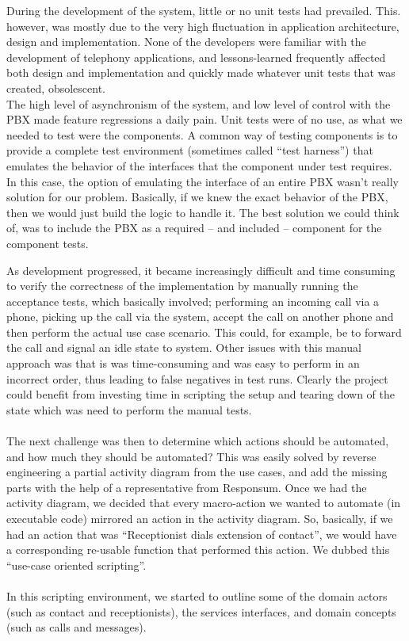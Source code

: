 During the development of the system, little or no unit tests had prevailed. This. however, was mostly due to the very high fluctuation in application architecture, design and implementation. None of the developers were familiar with the development of telephony applications, and lessons-learned frequently affected both design and implementation and quickly made whatever unit tests that was created, obsolescent.\\
The high level of asynchronism of the system, and low level of control with the PBX made feature regressions a daily pain. Unit tests were of no use, as what we needed to test were the components. A common way of testing components is to provide a complete test environment (sometimes called ``test harness'') that emulates the behavior of the interfaces that the component under test requires. In this case, the option of emulating the interface of an entire PBX wasn't really solution for our problem. Basically, if we knew the exact behavior of the PBX, then we would just build the logic to handle it. The best solution we could think of, was to include the PBX as a required -- and included -- component for the component tests.

As development progressed, it became increasingly difficult and time consuming to verify the correctness of the implementation by manually running the acceptance tests, which basically involved; performing an incoming call via a phone, picking up the call via the system, accept the call on another phone and then perform the actual use case scenario. This could, for example, be to forward the call and signal an idle state to system. Other issues with this manual approach was that is was time-consuming and was easy to perform in an incorrect order, thus leading to false negatives in test runs. Clearly the project could benefit from investing time in scripting the setup and tearing down of the state which was need to perform the manual tests.\\\\
The next challenge was then to determine which actions should be automated, and how much they should be automated? This was easily solved by reverse engineering a partial activity diagram from the use cases, and add the missing parts with the help of a representative from Responsum. Once we had the activity diagram, we decided that every macro-action we wanted to automate (in executable code) mirrored an action in the activity diagram. So, basically, if we had an action that was ``Receptionist dials extension of contact'', we would have a corresponding re-usable function that performed this action. We dubbed this ``use-case oriented scripting''.\\\\
In this scripting environment, we started to outline some of the domain actors (such as contact and receptionists), the services interfaces, and domain concepts (such as calls and messages).

